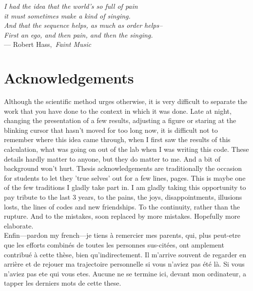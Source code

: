 

\begin{flushright}{\slshape    
    I had the idea that the world's so full of pain \\
    it must sometimes make a kind of singing. \\ 
    And that the sequence helps, as much as order helps--\\
    First an ego, and then pain, and then the singing.} \\\medskip
    --- Robert Hass,\, \emph{Faint Music}
\end{flushright}

\begingroup

\let\clearpage\relax
\let\cleardoublepage\relax
\let\cleardoublepage\relax

\chapter*{Acknowledgements} %


Although the scientific method urges otherwise, it is very difficult to separate
the work that you have done to the context in which it was done. Late at night,
changing the presentation of a few results, adjusting a figure or staring at the
blinking cursor that hasn't moved for too long now, it is difficult not to
remember where this idea came through, when I first saw the results of this
calculation, what was going on out of the lab when I was writing this code.
These details hardly matter to anyone, but they do matter to me. And a bit of
background won't hurt. Thesis acknowledgements are traditionally the occasion
for students to let they 'true selves' out for a few lines, pages. This is maybe
one of the few traditions I gladly take part in. I am gladly
taking this opportunity to pay tribute to the last $3$ years, to the pains, the
joys, disappointments, illusions losts, the lines of codes and new friendships.
To the continuity, rather than the rupture. And to the mistakes, soon replaced
by more mistakes.  Hopefully more elaborate.\\



Enfin---pardon my french---je tiens \`{a} remercier mes parents, qui, plus
peut-etre que les efforts combin\'es de toutes les personnes sus-cit\'ees, ont
amplement contribué à cette thèse, bien qu'indirectement. Il m'arrive souvent de
regarder en arrière et de rejouer ma trajectoire personnelle si vous n'aviez pas
été là. Si vous n'aviez pas ete qui vous etes. Aucune ne se termine ici, devant
mon ordinateur, a tapper les derniers mots de cette these.

